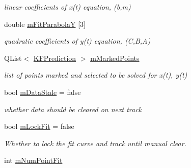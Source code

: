 \begin{DoxyCompactItemize}
\begin{DoxyCompactList}\small\item\em linear coefficients of x(t) equation, (b,m) \end{DoxyCompactList}\item 
double \hyperlink{classProjectorWindow_ac00d5ec253928b34c6d235359a442435}{m\+Fit\+ParabolaY} \mbox{[}3\mbox{]}\hypertarget{classProjectorWindow_ac00d5ec253928b34c6d235359a442435}{}\label{classProjectorWindow_ac00d5ec253928b34c6d235359a442435}

\begin{DoxyCompactList}\small\item\em quadratic coefficients of y(t) equation, (C,B,A) \end{DoxyCompactList}\item 
Q\+List$<$ \hyperlink{classKFPrediction}{K\+F\+Prediction} $>$ \hyperlink{classProjectorWindow_aeecd77891365fc2e73afa0daca12d7cf}{m\+Marked\+Points}\hypertarget{classProjectorWindow_aeecd77891365fc2e73afa0daca12d7cf}{}\label{classProjectorWindow_aeecd77891365fc2e73afa0daca12d7cf}

\begin{DoxyCompactList}\small\item\em list of points marked and selected to be solved for x(t), y(t) \end{DoxyCompactList}\item 
bool \hyperlink{classProjectorWindow_ab8347688431276a58bd9f59171e28ee7}{m\+Data\+Stale} = false\hypertarget{classProjectorWindow_ab8347688431276a58bd9f59171e28ee7}{}\label{classProjectorWindow_ab8347688431276a58bd9f59171e28ee7}

\begin{DoxyCompactList}\small\item\em whether data should be cleared on next track \end{DoxyCompactList}\item 
bool \hyperlink{classProjectorWindow_a45339f9bc9832f04a89358e9905c64a7}{m\+Lock\+Fit} = false\hypertarget{classProjectorWindow_a45339f9bc9832f04a89358e9905c64a7}{}\label{classProjectorWindow_a45339f9bc9832f04a89358e9905c64a7}

\begin{DoxyCompactList}\small\item\em Whether to lock the fit curve and track until manual clear. \end{DoxyCompactList}\item 
int \hyperlink{classProjectorWindow_a9e8bc338e04d434087d2edf1ccd5b8b5}{m\+Num\+Point\+Fit}\hypertarget{classProjectorWindow_a9e8bc338e04d434087d2edf1ccd5b8b5}{}\label{classProjectorWindow_a9e8bc338e04d434087d2edf1ccd5b8b5}


\end{DoxyCompactItemize}
